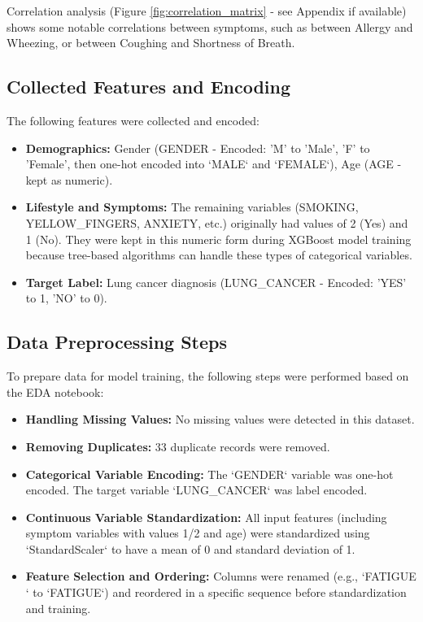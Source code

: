 Correlation analysis (Figure \ref{fig:correlation_matrix} - see Appendix if available) shows some notable correlations between symptoms, such as between Allergy and Wheezing, or between Coughing and Shortness of Breath.

\subsection{Collected Features and Encoding}

The following features were collected and encoded:
\begin{itemize}
    \item \textbf{Demographics:} Gender (GENDER - Encoded: 'M' to 'Male', 'F' to 'Female', then one-hot encoded into `MALE` and `FEMALE`), Age (AGE - kept as numeric).
    \item \textbf{Lifestyle and Symptoms:} The remaining variables (SMOKING, YELLOW\_FINGERS, ANXIETY, etc.) originally had values of 2 (Yes) and 1 (No). They were kept in this numeric form during XGBoost model training because tree-based algorithms can handle these types of categorical variables.
    \item \textbf{Target Label:} Lung cancer diagnosis (LUNG\_CANCER - Encoded: 'YES' to 1, 'NO' to 0).
\end{itemize}

\subsection{Data Preprocessing Steps}

To prepare data for model training, the following steps were performed based on the EDA notebook:
\begin{itemize}
    \item \textbf{Handling Missing Values:} No missing values were detected in this dataset.
    \item \textbf{Removing Duplicates:} 33 duplicate records were removed.
    \item \textbf{Categorical Variable Encoding:} The `GENDER` variable was one-hot encoded. The target variable `LUNG_CANCER` was label encoded.
    \item \textbf{Continuous Variable Standardization:} All input features (including symptom variables with values 1/2 and age) were standardized using `StandardScaler` to have a mean of 0 and standard deviation of 1.
    \item \textbf{Feature Selection and Ordering:} Columns were renamed (e.g., `FATIGUE ` to `FATIGUE`) and reordered in a specific sequence before standardization and training.
\end{itemize}

